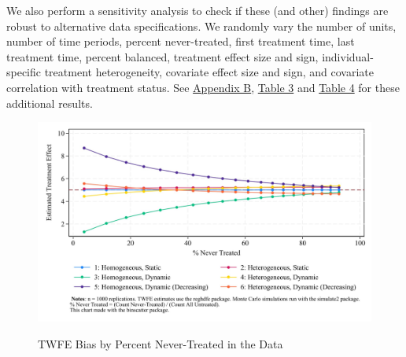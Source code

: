 \documentclass[12pt]{article}
\begin{document}
We also perform a sensitivity analysis to check if these (and other) findings are robust to alternative data specifications. We randomly vary the number of units, number of time periods, percent never-treated, first treatment time, last treatment time, percent balanced, treatment effect size and sign, individual-specific treatment heterogeneity, covariate effect size and sign, and covariate correlation with treatment status. See \hyperref[sec:appendixb]{Appendix B}, \hyperref[tab:sensitivity-table]{Table 3} and \hyperref[tab:sensitivity-table-interact]{Table 4} for these additional results.
\begin{figure}[H]
    \centering
    \caption{TWFE Bias by Percent Never-Treated in the Data}
    \includegraphics[width=5in]{Figures/TWFE Bias by Percent Never Treated.jpg}
    \label{fig:pc-nevertreat}
\end{figure}
\end{document}
